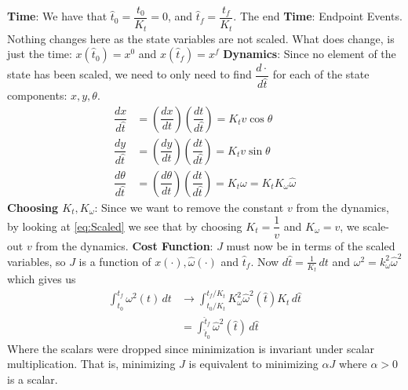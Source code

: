 \documentclass[10pt]{article}
\newcommand{\dint}{\displaystyle\int}
\newcommand{\libz}[2]{\dfrac{d #1}{d #2} }
\newcommand{\plibz}[2]{\left(\dfrac{d #1}{d #2}\right) }
\begin{document}
\begin{enumerate}[leftmargin=*]
\begin{enumerate}
          \textbf{Time}: We have that $\hat t_0= \dfrac{t_0}{K_t}=0$, and $\hat t_f=\dfrac{t_f}{K_t}$.  The end
          \textbf{Time}:  Endpoint Events.  Nothing changes here as the state variables are not scaled.  What does change, is just the time: $x(\hat t_0)=x^0$ and $x(\hat t_f)=x^f$
          \textbf{Dynamics}: Since no element of the state has been scaled, we need to only need to find $\libz{\cdot}{\hat t}$ for each of the state components: $x,y,\theta$.
          \begin{align} \label{eq:Scaled}
            \libz{x}{\hat t} &= \plibz{x}{ t}\plibz{t}{\hat t} = K_tv\cos\theta\\
            \libz{y}{\hat t} &= \plibz{y}{ t}\plibz{t}{\hat t} = K_tv\sin\theta\\
            \libz{\theta}{\hat t} &= \plibz{\theta}{ t}\plibz{t}{\hat t} = K_t\omega = K_tK_\omega\hat\omega
          \end{align}
          \textbf{Choosing $K_t,K_\omega$}: Since we want to remove the constant $v$ from the dynamics, by looking at \ref{eq:Scaled} we see that by choosing $K_t=\dfrac{1}{v}$ and $K_\omega=v$, we scale-out $v$ from the dynamics.
          \textbf{Cost Function}: $J$ must now be in terms of the scaled variables, so $J$ is a function of $x(\cdot), \hat\omega(\cdot)$ and $\hat t_f$.  Now $d\hat t = \frac{1}{K_t}\,dt$ and $\omega^2=k_\omega^2\hat\omega^2$ which gives us
          \begin{align*}
            \dint_{t_0}^{t_f} \omega^2(t)\,dt
                   &\longrightarrow \dint_{t_0/K_t}^{t_f/K_t}K_\omega^2\hat\omega^2(\hat t) K_t\,d\hat t\\
                   &= \dint_{\hat t_0}^{\hat t_f}\hat\omega^2(\hat t) \,d\hat t
          \end{align*}
          Where the scalars were dropped since minimization is invariant under scalar multiplication.  That is, minimizing $J$ is equivalent to minimizing $\alpha J$ where $\alpha>0$ is a scalar.


\end{enumerate}
\end{enumerate}
\end{document}
